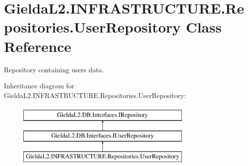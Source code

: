 \hypertarget{class_gielda_l2_1_1_i_n_f_r_a_s_t_r_u_c_t_u_r_e_1_1_repositories_1_1_user_repository}{}\section{Gielda\+L2.\+I\+N\+F\+R\+A\+S\+T\+R\+U\+C\+T\+U\+R\+E.\+Repositories.\+User\+Repository Class Reference}
\label{class_gielda_l2_1_1_i_n_f_r_a_s_t_r_u_c_t_u_r_e_1_1_repositories_1_1_user_repository}


Repository containing users data.  


Inheritance diagram for Gielda\+L2.\+I\+N\+F\+R\+A\+S\+T\+R\+U\+C\+T\+U\+R\+E.\+Repositories.\+User\+Repository\+:\begin{figure}[H]
\begin{center}
\leavevmode
\includegraphics[height=3.000000cm]{class_gielda_l2_1_1_i_n_f_r_a_s_t_r_u_c_t_u_r_e_1_1_repositories_1_1_user_repository}
\end{center}
\end{figure}
